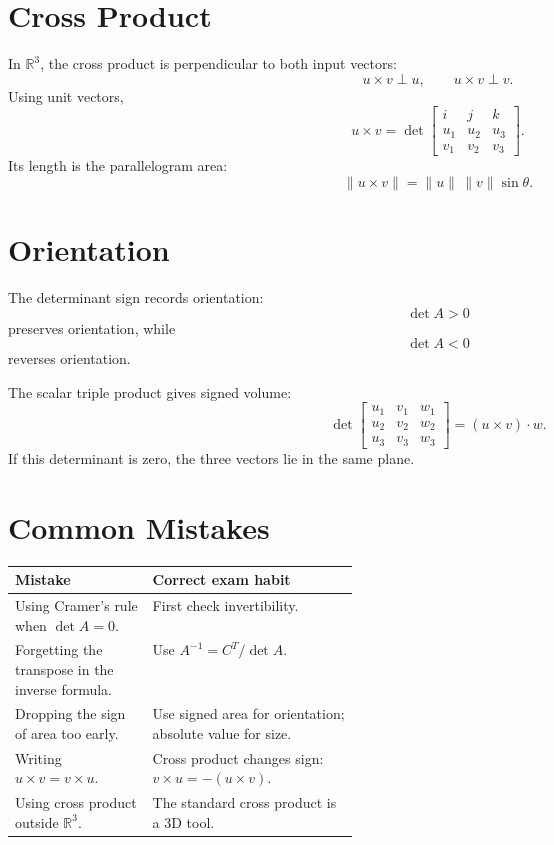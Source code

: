 \documentclass[10pt]{article}
\begin{document}
\section{Cross Product}

In \(\mathbb{R}^3\), the cross product is perpendicular to both input vectors:
\[
u\times v\perp u,
\qquad
u\times v\perp v.
\]
Using unit vectors,
\[
u\times v=
\det
\begin{bmatrix}
i&j&k\\
u_1&u_2&u_3\\
v_1&v_2&v_3
\end{bmatrix}.
\]
Its length is the parallelogram area:
\[
\|u\times v\|=\|u\|\,\|v\|\sin\theta.
\]


\section{Orientation}

The determinant sign records orientation:
\[
\det A>0
\]
preserves orientation, while
\[
\det A<0
\]
reverses orientation.

The scalar triple product gives signed volume:
\[
\det
\begin{bmatrix}
u_1&v_1&w_1\\
u_2&v_2&w_2\\
u_3&v_3&w_3
\end{bmatrix}
=(u\times v)\cdot w.
\]
If this determinant is zero, the three vectors lie in the same plane.

\section{Common Mistakes}

\begin{center}
\small
\begin{tabularx}{\linewidth}{@{}L{0.40\linewidth}Y@{}}
\toprule
Mistake & Correct exam habit \\
\midrule
Using Cramer's rule when \(\det A=0\). & First check invertibility. \\
Forgetting the transpose in the inverse formula. & Use \(A^{-1}=C^{T}/\det A\). \\
Dropping the sign of area too early. & Use signed area for orientation; absolute value for size. \\
Writing \(u\times v=v\times u\). & Cross product changes sign: \(v\times u=-(u\times v)\). \\
Using cross product outside \(\mathbb{R}^3\). & The standard cross product is a 3D tool. \\
\bottomrule
\end{tabularx}
\end{center}
\end{document}
